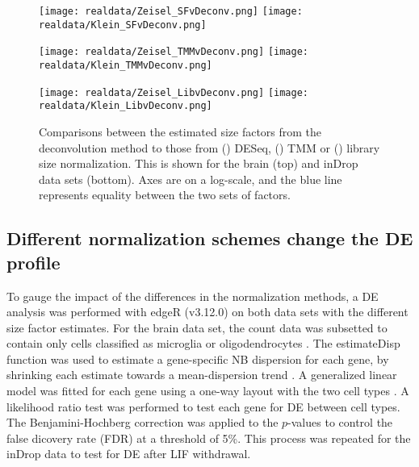 \documentclass{article}
\begin{document}
\begin{figure}[btp]
    \begin{minipage}{0.33\textwidth}
        \texttt{[image: realdata/Zeisel\_SFvDeconv.png]}
        \texttt{[image: realdata/Klein\_SFvDeconv.png]}
        \subcaption{}\label{subfig:comp_sf}
    \end{minipage}
    \begin{minipage}{0.33\textwidth}
        \texttt{[image: realdata/Zeisel\_TMMvDeconv.png]}
        \texttt{[image: realdata/Klein\_TMMvDeconv.png]}
    \subcaption{}\label{subfig:comp_tmm}
    \end{minipage}
    \begin{minipage}{0.33\textwidth}
        \texttt{[image: realdata/Zeisel\_LibvDeconv.png]}
        \texttt{[image: realdata/Klein\_LibvDeconv.png]}
        \subcaption{}\label{subfig:comp_lib}
    \end{minipage}
    \caption{
        Comparisons between the estimated size factors from the deconvolution method to those from () DESeq,  () TMM
            or () library size normalization.
        This is shown for the brain (top) and inDrop data sets (bottom).
        Axes are on a log-scale, and the blue line represents equality between the two sets of factors.
    }
    \label{fig:real_comp}  
\end{figure}

\subsection{Different normalization schemes change the DE profile}
To gauge the impact of the differences in the normalization methods, a DE analysis was performed with edgeR (v3.12.0) on both data sets with the different size factor estimates.
For the brain data set, the count data was subsetted to contain only cells classified as microglia or oligodendrocytes \cite{zeisel2015brain}.
The estimateDisp function was used to estimate a gene-specific NB dispersion for each gene, by shrinking each estimate towards a mean-dispersion trend \cite{chen2014differential}.
A generalized linear model was fitted for each gene using a one-way layout with the two cell types \cite{mccarthy2012differential}.
A likelihood ratio test was performed to test each gene for DE between cell types.
The Benjamini-Hochberg correction was applied to the $p$-values to control the false dicovery rate (FDR) at a threshold of 5\%.
This process was repeated for the inDrop data to test for DE after LIF withdrawal.
\end{document}
